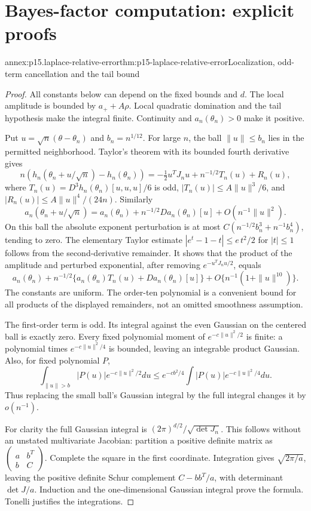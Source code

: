 \section{Bayes-factor computation: explicit proofs}
\label{sec:annex-p15-bayes-factor-computation}

\begin{annexitem}{annex:p15.laplace-relative-error}{thm:p15-laplace-relative-error}{Localization, odd-term cancellation and the tail bound}
\begin{proof}
All constants below can depend on the fixed bounds and \(d\).
The local amplitude is bounded by \(a_++A\rho\). Local quadratic
domination and the tail hypothesis make the integral finite. Continuity
and \(a_n(\theta_n)>0\) make it positive.

Put \(u=\sqrt n(\theta-\theta_n)\) and \(b_n=n^{1/12}\).
For large \(n\), the ball \(\|u\|\leq b_n\) lies in the permitted
neighborhood. Taylor's theorem with its bounded fourth derivative gives
\[
 n(h_n(\theta_n+u/\sqrt n)-h_n(\theta_n))
 =-\tfrac12u^TJ_nu+n^{-1/2}T_n(u)+R_n(u),
\]
where \(T_n(u)=D^3h_n(\theta_n)[u,u,u]/6\) is odd,
\(|T_n(u)|\leq A\|u\|^3/6\), and
\(|R_n(u)|\leq A\|u\|^4/(24n)\).
Similarly
\[
 a_n(\theta_n+u/\sqrt n)=a_n(\theta_n)
       +n^{-1/2}Da_n(\theta_n)[u]+O(n^{-1}\|u\|^2).
\]
On this ball the absolute exponent perturbation is at most
\(C(n^{-1/2}b_n^3+n^{-1}b_n^4)\), tending to zero.
The elementary Taylor estimate
\(|e^t-1-t|\leq e\,t^2/2\) for \(|t|\leq1\) follows from the
second-derivative remainder. It shows that the product of the amplitude
and perturbed exponential, after removing \(e^{-u^TJ_nu/2}\), equals
\[
 a_n(\theta_n)+n^{-1/2}
 \{a_n(\theta_n)T_n(u)+Da_n(\theta_n)[u]\}
             +O\{n^{-1}(1+\|u\|^{10})\}.
\]
The constants are uniform. The order-ten polynomial is a convenient bound
for all products of the displayed remainders, not an omitted smoothness
assumption.

The first-order term is odd. Its integral against the even Gaussian on
the centered ball is exactly zero. Every fixed polynomial moment of
\(e^{-c\|u\|^2/2}\) is finite: a polynomial times
\(e^{-c\|u\|^2/4}\) is bounded, leaving an integrable product Gaussian.
Also, for fixed polynomial \(P\),
\[
 \int_{\|u\|>b}|P(u)|e^{-c\|u\|^2/2}du
 \leq e^{-cb^2/4}\int |P(u)|e^{-c\|u\|^2/4}du.
\]
Thus replacing the small ball's Gaussian integral by the full integral
changes it by \(o(n^{-1})\).

For clarity the full Gaussian integral is
\((2\pi)^{d/2}/\sqrt{\det J_n}\). This follows without an unstated
multivariate Jacobian: partition a positive definite matrix as
\(\left(\begin{smallmatrix}a&b^T\\b&C\end{smallmatrix}\right)\).
Complete the square in the first coordinate. Integration gives
\(\sqrt{2\pi/a}\), leaving the positive definite Schur complement
\(C-bb^T/a\), with determinant \(\det J/a\). Induction and the
one-dimensional Gaussian integral prove the formula. Tonelli justifies
the integrations.


\end{proof}
\end{annexitem}
